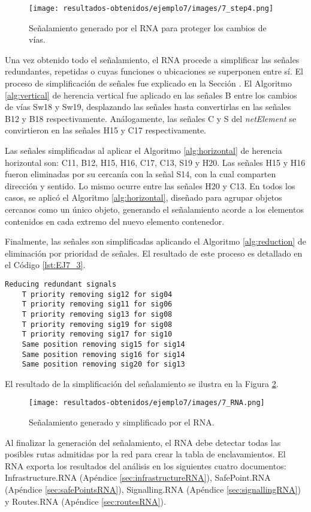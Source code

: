 	\begin{figure}[H]
		\centering
		\texttt{[image: resultados-obtenidos/ejemplo7/images/7\_step4.png]}
		\centering\caption{Señalamiento generado por el RNA para proteger los cambios de vías.}
		\label{fig:EJ7_6}
	\end{figure}
	
	Una vez obtenido todo el señalamiento, el RNA procede a simplificar las señales redundantes, repetidas o cuyas funciones o ubicaciones se superponen entre sí. El proceso de simplificación de señales fue explicado en la Sección \label{sec:simplificacion}. El Algoritmo \ref{alg:vertical} de herencia vertical fue aplicado en las señales B entre los cambios de vías Sw18 y Sw19, desplazando las señales hasta convertirlas en las señales B12 y B18 respectivamente. Análogamente, las señales C y S del \textit{netElement} se convirtieron en las señales H15 y C17 respectivamente.
	
	Las señales simplificadas al aplicar el Algoritmo \ref{alg:horizontal} de herencia horizontal son: C11, B12, H15, H16, C17, C13, S19 y H20. Las señales H15 y H16 fueron eliminadas por su cercanía con la señal S14, con la cual comparten dirección y sentido. Lo mismo ocurre entre las señales H20 y C13. En todos los casos, se aplicó el Algoritmo \ref{alg:horizontal}, diseñado para agrupar objetos cercanos como un único objeto, generando el señalamiento acorde a los elementos contenidos en cada extremo del nuevo elemento contenedor.
	
	Finalmente, las señales son simplificadas aplicando el Algoritmo \ref{alg:reduction} de eliminación por prioridad de señales. El resultado de este proceso es detallado en el Código \ref{lst:EJ7_3}.
	
	\begin{lstlisting}[language = {}, caption = Reducción de señalamiento por prioridad de señales, label = {lst:EJ7_3}]
	Reducing redundant signals
	T priority removing sig12 for sig04
	T priority removing sig11 for sig06
	T priority removing sig13 for sig08
	T priority removing sig19 for sig08
	T priority removing sig17 for sig10
	Same position removing sig15 for sig14
	Same position removing sig16 for sig14
	Same position removing sig20 for sig13
	\end{lstlisting}
	
	El resultado de la simplificación del señalamiento se ilustra en la Figura \ref{fig:EJ7_7}.
	
	\begin{figure}[H]
		\centering
		\texttt{[image: resultados-obtenidos/ejemplo7/images/7\_RNA.png]}
		\centering\caption{Señalamiento generado y simplificado por el RNA.}
		\label{fig:EJ7_7}
	\end{figure}
	
	Al finalizar la generación del señalamiento, el RNA debe detectar todas las posibles rutas admitidas por la red para crear la tabla de enclavamientos. El RNA exporta los resultados del análisis en los siguientes cuatro documentos: Infrastructure.RNA (Apéndice \ref{sec:infrastructureRNA}), SafePoint.RNA (Apéndice \ref{sec:safePointsRNA}), Signalling.RNA (Apéndice \ref{sec:signallingRNA}) y Routes.RNA (Apéndice \ref{sec:routesRNA}).